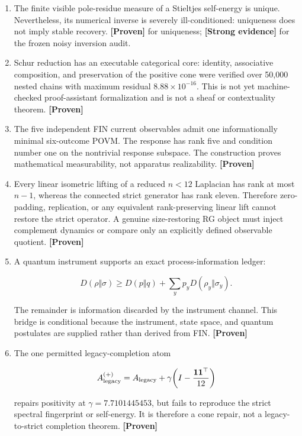 \documentclass[11pt,a4paper,openany]{report}
\newcommand{\statusProven}{\textcolor{fingreen}{[Proven]}}
\newcommand{\statusStrong}{\textcolor{finblue}{[Strong evidence]}}
\begin{document}
\begin{enumerate}
\item 
The finite visible pole-residue measure of a Stieltjes self-energy is unique. Nevertheless, its numerical inverse is severely ill-conditioned: uniqueness does not imply stable recovery. \textbf{\statusProven{}} for uniqueness; \textbf{\statusStrong{}} for the frozen noisy inversion audit.

\item 
Schur reduction has an executable categorical core: identity, associative composition, and preservation of the positive cone were verified over 50,000 nested chains with maximum residual \(8.88\times10^{-16}\). This is not yet machine-checked proof-assistant formalization and is not a sheaf or contextuality theorem. \textbf{\statusProven{}}

\item 
The five independent FIN current observables admit one informationally minimal six-outcome POVM. The response has rank five and condition number one on the nontrivial response subspace. The construction proves mathematical measurability, not apparatus realizability. \textbf{\statusProven{}}

\item 
Every linear isometric lifting of a reduced \(n<12\) Laplacian has rank at most \(n-1\), whereas the connected strict generator has rank eleven. Therefore zero-padding, replication, or any equivalent rank-preserving linear lift cannot restore the strict operator. A genuine size-restoring RG object must inject complement dynamics or compare only an explicitly defined observable quotient. \textbf{\statusProven{}}

\item 
A quantum instrument supports an exact process-information ledger:

\[
   D(\rho\Vert\sigma)
   \ge
   D(p\Vert q)
   +
   \sum_y p_yD(\rho_y\Vert\sigma_y).
   \]

The remainder is information discarded by the instrument channel. This bridge is conditional because the instrument, state space, and quantum postulates are supplied rather than derived from FIN. \textbf{\statusProven{}}

\item 
The one permitted legacy-completion atom

\[
   A_{\rm legacy}^{(+)}
   =
   A_{\rm legacy}
   +
   \gamma\!\left(I-\frac{\mathbf1\mathbf1^\top}{12}\right)
   \]

repairs positivity at \(\gamma=7.7101445453\), but fails to reproduce the strict spectral fingerprint or self-energy. It is therefore a cone repair, not a legacy-to-strict completion theorem. \textbf{\statusProven{}}


\end{enumerate}
\end{document}
